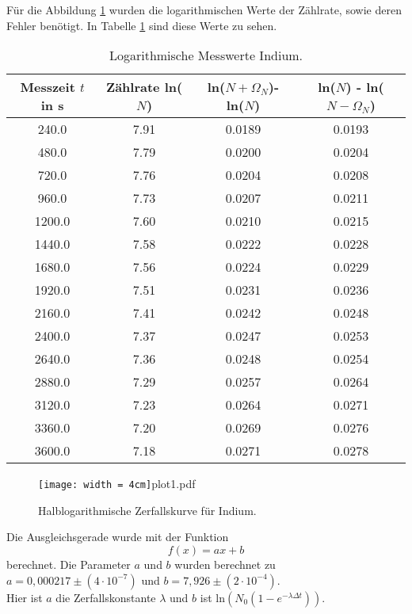 Für die Abbildung \ref{fig:plot1} wurden die logarithmischen Werte der Zählrate, sowie deren Fehler benötigt.
In Tabelle \ref{tab:lnN1} sind diese Werte zu sehen.

\begin{table}
  \centering
  \caption{Logarithmische Messwerte Indium.}
  \label{tab:lnN1}
\begin{tabular}{c c c c}
  \toprule
  Messzeit $t$ in s & Zählrate ln($N$) & ln($N + \Omega_N$)- ln($N$) & ln($N$) - ln($N - \Omega_N$)\\
  \midrule
  240.0 & 7.91 & 0.0189 & 0.0193 \\
  480.0 & 7.79 & 0.0200 & 0.0204 \\
  720.0 & 7.76 & 0.0204 & 0.0208 \\
  960.0 & 7.73 & 0.0207 & 0.0211 \\
  1200.0 & 7.60 & 0.0210 & 0.0215 \\
  1440.0 & 7.58 & 0.0222 & 0.0228 \\
  1680.0 & 7.56 & 0.0224 & 0.0229 \\
  1920.0 & 7.51 & 0.0231 & 0.0236 \\
  2160.0 & 7.41 & 0.0242 & 0.0248 \\
  2400.0 & 7.37 & 0.0247 & 0.0253 \\
  2640.0 & 7.36 & 0.0248 & 0.0254 \\
  2880.0 & 7.29 & 0.0257 & 0.0264 \\
  3120.0 & 7.23 & 0.0264 & 0.0271 \\
  3360.0 & 7.20 & 0.0269 & 0.0276 \\
  3600.0 & 7.18 & 0.0271 & 0.0278 \\
  \bottomrule
\end{tabular}
\end{table}
\FloatBarrier

\begin{figure}
  \centering
  \texttt{[image: width = 4cm]}{plot1.pdf}
  \caption{Halblogarithmische Zerfallskurve für Indium.}
  \label{fig:plot1}
\end{figure}
\FloatBarrier

Die Ausgleichsgerade wurde mit der Funktion
\begin{equation}
  f(x) = ax +b
  \label{eqn:glFit}
\end{equation}
berechnet.
Die Parameter $a$ und $b$ wurden berechnet zu $a = 0,000217 \pm (4 \cdot 10^{-7})$ und $b = 7,926 \pm (2 \cdot 10^{-4})$. \\
Hier ist $a$ die Zerfallskonstante $\lambda$ und $b$ ist $\text{ln}(N_0(1-e^{-\lambda \Delta t}))$. \\

